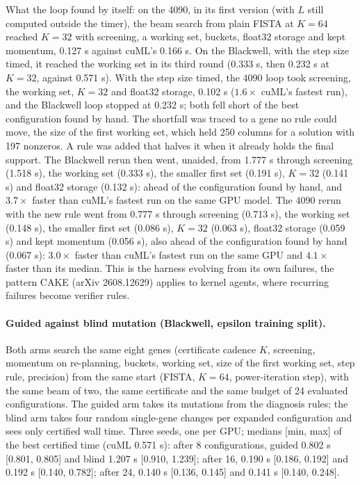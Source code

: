 \documentclass[11pt]{article}
\begin{document}
What the loop found by itself: on the 4090, in its first version (with $L$
still computed outside the timer), the beam search from plain FISTA at $K=64$
reached $K=32$ with screening, a working set, buckets, float32 storage and
kept momentum, 0.127 s against cuML's 0.166 s. On the Blackwell, with the step
size timed, it reached the working set in its third round (0.333 s, then 0.232 s
at $K=32$, against 0.571 s). With the step size timed, the 4090 loop took screening, the working set,
$K=32$ and float32 storage, 0.102 s ($1.6\times$ cuML's fastest run), and the
Blackwell loop stopped at 0.232 s; both fell short of the best configuration
found by hand. The shortfall was traced to a gene no rule could move, the size
of the first working set, which held 250 columns for a solution with 197
nonzeros. A rule was added that halves it when it already holds the final
support. The Blackwell rerun then went, unaided, from 1.777 s through screening
(1.518 s), the working set (0.333 s), the smaller first set (0.191 s), $K=32$
(0.141 s) and float32 storage (0.132 s): ahead of the configuration found by
hand, and $3.7\times$ faster than cuML's fastest run on the same GPU model. The
4090 rerun with the new rule went from 0.777 s through screening (0.713 s), the
working set (0.148 s), the smaller first set (0.086 s), $K=32$ (0.063 s), float32
storage (0.059 s) and kept momentum (0.056 s), also ahead of the configuration
found by hand (0.067 s): $3.0\times$ faster than cuML's fastest run on the same GPU
and $4.1\times$ faster than its median. This is the harness evolving from
its own failures, the pattern CAKE (arXiv 2608.12629) applies to kernel agents,
where recurring failures become verifier rules.

\paragraph{Guided against blind mutation (Blackwell, epsilon training split).}
 Both arms search the same eight genes
(certificate cadence $K$, screening, momentum on re-planning, buckets, working
set, size of the first working set, step rule, precision) from the same start
(FISTA, $K=64$, power-iteration step), with the same beam of two, the same
certificate and the same budget of 24 evaluated configurations. The guided arm
takes its mutations from the diagnosis rules; the blind arm takes four random
single-gene changes per expanded configuration and sees only certified wall
time. Three seeds, one per GPU; medians [min, max] of the best certified time
(cuML 0.571 s): after 8 configurations, guided 0.802 s [0.801, 0.805] and blind
1.207 s [0.910, 1.239]; after 16, 0.190 s [0.186, 0.192] and 0.192 s [0.140,
0.782]; after 24, 0.140 s [0.136, 0.145] and 0.141 s [0.140, 0.248].
\end{document}

